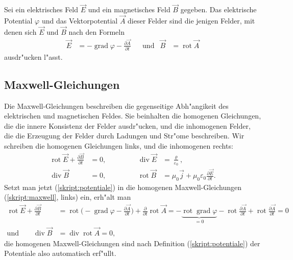 \begin{definition}
%
Sei ein elektrisches Feld $\vec E$ und ein magnetisches Feld $\vec B$
gegeben.
Das elektrische Potential $\varphi$ und das Vektorpotential $\vec A$ 
dieser Felder sind die jenigen Felder, mit denen sich $\vec E$ und $\vec B$
nach den Formeln
\begin{equation}
\begin{aligned}
\vec E
&=
-\operatorname{grad}\varphi
-\frac{\partial\vec A}{\partial t}
&&\text{und}&
\vec B
&=
\operatorname{rot}\vec A
\end{aligned}
\label{skript:potentiale}
\end{equation}
ausdr"ucken l"asst.
\end{definition}

\subsection{Maxwell-Gleichungen}
Die Maxwell-Gleichungen beschreiben die gegenseitige Abh"angikeit 
des elektrischen und magnetischen Feldes. 
Sie beinhalten die homogenen Gleichungen, die die innere Konsistenz
der Felder ausdr"ucken, und die inhomogenen Felder, die die Erzeugung
der Felder durch Ladungen und Str"ome beschreiben.
Wir schreiben die homogenen Gleichungen links, und die inhomogenen
rechts:
\begin{equation}
\begin{aligned}
\operatorname{rot}\vec E+\frac{\partial\vec B}{\partial t}&=0,
&\qquad&&
\operatorname{div}\vec E&=\frac{\varrho}{\varepsilon_0},
\\
\operatorname{div}\vec B&=0,
&\qquad&&
\operatorname{rot}\vec B&=\mu_0\vec j+\mu_0\varepsilon_0\frac{\partial\vec E}{\partial t}.
\end{aligned}
\label{skript:maxwell}
\end{equation}
Setzt man jetzt (\ref{skript:potentiale}) in die homogenen
Maxwell-Gleichungen (\ref{skript:maxwell}, links) ein, erh"alt man
\begin{align*}
\operatorname{rot}\vec E+\frac{\partial\vec B}{\partial t}
&=
\operatorname{rot}\biggl(
-\operatorname{grad}\varphi-\frac{\partial\vec A}{\partial t}
\biggr)
+\frac{\partial}{\partial t}\operatorname{rot}\vec A
=
-\underbrace{\operatorname{rot}\operatorname{grad}\varphi}_{=0}
-\operatorname{rot}\frac{\partial\vec A}{\partial t}
+\operatorname{rot}\frac{\partial\vec A}{\partial t}
=0
\\
\text{und}\qquad
\operatorname{div}\vec B&=\operatorname{div}\operatorname{rot}\vec A=0,
\end{align*}
die homogenen Maxwell-Gleichungen sind nach Definition
(\ref{skript:potentiale}) der Potentiale also automatisch erf"ullt.

